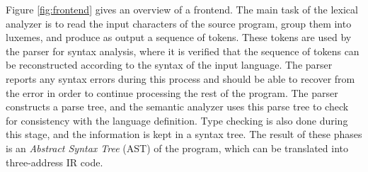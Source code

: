%
%
%
%
%
%

Figure \ref{fig:frontend} gives an overview of a frontend. The main task of the lexical analyzer is to read the input characters of the source program, group them into luxemes, and produce as output a sequence of tokens. These tokens are used by the parser for syntax analysis, where it is verified that the sequence of tokens can be reconstructed according to the syntax of the input language. The parser reports any syntax errors during this process and should be able to recover from the error in order to continue processing the rest of the program. The parser constructs a parse tree, and the semantic analyzer uses this parse tree to check for consistency with the language definition. Type checking is also done during this stage, and the information is kept in a syntax tree. The result of these phases is an \emph{Abstract Syntax Tree} (AST) of the program, which can be translated into three-address IR code. %

